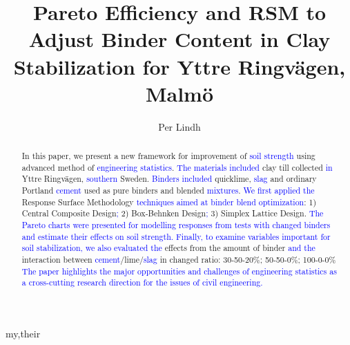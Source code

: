 \documentclass[eprint,
]{actapoly}
\begin{document}
\title[Pareto Efficiency and RSM to Adjust Binder Content]
{Pareto Efficiency and RSM to Adjust Binder Content in Clay Stabilization for Yttre Ringvägen, Malmö}

\author[P. Lindh]{Per Lindh}{my,their}


\begin{abstract}
In this paper, we present a new framework for improvement of \textcolor{blue}{soil strength} using advanced method of \textcolor{blue}{engineering statistics}. \textcolor{blue}{The materials included} clay till collected \textcolor{blue}{in} Yttre Ringvägen, \textcolor{blue}{southern} Sweden. \textcolor{blue}{Binders included} quicklime, \textcolor{blue}{slag} and ordinary Portland \textcolor{blue}{cement} used as pure binders and blended \textcolor{blue}{mixtures}. \textcolor{blue}{We first applied the} Response Surface Methodology \textcolor{blue}{techniques aimed at binder blend optimization}: 1) Central Composite Design\textcolor{blue}{;} 2) Box-Behnken Design\textcolor{blue}{;} 3) Simplex Lattice Design. \textcolor{blue}{The Pareto charts were presented for modelling responses from tests with changed binders \textcolor{blue}{and estimate their }effects on \textcolor{blue}{soil} strength. Finally, to examine variables important for soil stabilization, we also evaluated the }effects from the amount of binder \textcolor{blue}{and the} interaction between \textcolor{blue}{cement}/lime/\textcolor{blue}{slag} in changed ratio: 30-50-20\%; 50-50-0\%; 100-0-0\% \textcolor{blue}{The paper highlights the major opportunities and challenges of engineering statistics as a cross-cutting research direction for the issues of civil engineering.}
\end{abstract}

\end{document}
